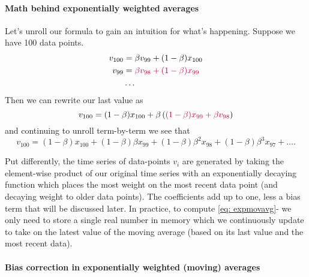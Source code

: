 \documentclass[12pt]{article}
\begin{document}
\paragraph{Math behind exponentially weighted averages} Let's unroll our formula to 
gain an intuition for what's happening. Suppose we have 100 data points.
\begin{align*}   v_{100} &= \beta v_{99} + (1-\beta) x_{100} \\
  v_{99}  &= \color{purple} \beta v_{98} + (1-\beta) x_{99} \\ 
  &\ldots \end{align*}
Then we can rewrite our last value as 
\[
  v_{100} = (1-\beta) x_{100} + \beta \left( \color{purple} (1-\beta) x_{99} + \beta v_{98} \color{black} \right) 
\]
and continuing to unroll term-by-term we see that
\[
  v_{100} = (1-\beta) x_{100} + (1-\beta) \beta x_{99} + (1-\beta) \beta^2 x_{98} + (1-\beta) \beta^3 x_{97} + \ldots.
\]

Put differently, the time series of data-points $v_i$ are generated by taking the element-wise product of our original time series with an exponentially decaying function which places the most weight on the most recent data point (and decaying weight to older data points). The coefficients add up to one, less a bias term that will be discussed later. In practice, to compute \ref{eq: expmovavg}- we only need to store a single real number in memory which we continuously update to take on the latest value of 
the moving average (based on its last value and the most recent data).

\paragraph{Bias correction in exponentially weighted (moving) averages}
\end{document}

